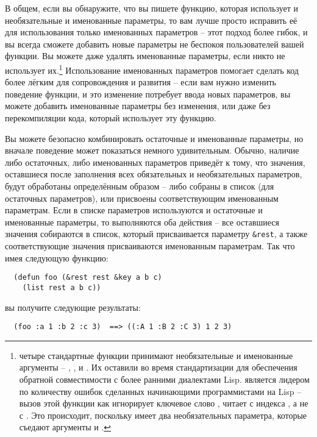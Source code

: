 В общем, если вы обнаружите, что вы пишете функцию, которая использует и необязательные и
именованные параметры, то вам лучше просто исправить её для использования только
именованных параметров -- этот подход более гибок, и вы всегда сможете добавить новые
параметры не беспокоя пользователей вашей функции.  Вы можете даже удалять именованные
параметры, если никто не использует их.\footnote{четыре стандартные функции принимают
  необязательные и именованные аргументы -- ,
  ,  и .  Их оставили во время
  стандартизации для обеспечения обратной совместимости с более ранними диалектами Lisp.
   является лидером по количеству ошибок сделанных начинающими
  программистами на Lisp -- вызов этой функции как 
  игнорирует ключевое слово , читает с индекса , а не с .
  Это происходит, поскольку  имеет два необязательных параметра,
  которые съедают аргументы  и .}  Использование именованных
параметров помогает сделать код более лёгким для сопровождения и развития -- если вам
нужно изменить поведение функции, и это изменение потребует ввода новых параметров, вы
можете добавить именованные параметры без изменения, или даже без перекомпиляции кода,
который использует эту функцию.

Вы можете безопасно комбинировать остаточные и именованные параметры, но вначале поведение
может показаться немного удивительным.  Обычно, наличие либо остаточных, либо именованных
параметров приведёт к тому, что значения, оставшиеся после заполнения всех обязательных и
необязательных параметров, будут обработаны определённым образом -- либо собраны в список
(для остаточных параметров), или присвоены соответствующим именованным параметрам. Если в
списке параметров используются и остаточные и именованные параметры, то выполняются оба
действия -- все оставшиеся значения собираются в список, который присваивается параметру
\lstinline!&rest!, а также соответствующие значения присваиваются именованным параметрам.
Так что имея следующую функцию:

\begin{lstlisting}
  (defun foo (&rest rest &key a b c) 
    (list rest a b c))
\end{lstlisting}

вы получите следующие результаты:

\begin{verbatim}
  (foo :a 1 :b 2 :c 3)  ==> ((:A 1 :B 2 :C 3) 1 2 3)
\end{verbatim}


